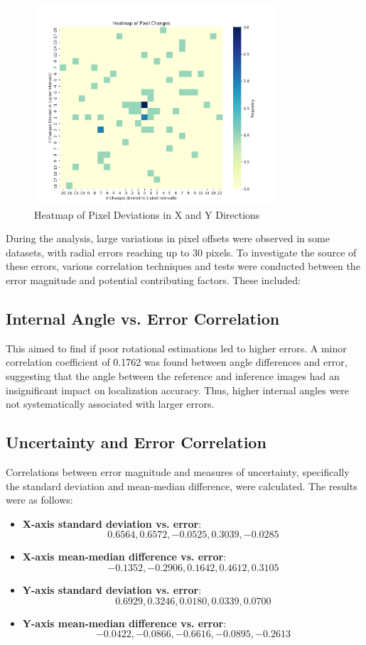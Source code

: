 \begin{figure}[H]
    \centering
    \includegraphics[width=0.8\textwidth]{Chapter 5/RESULTPLOTS/BIASPLOT_XY_HEAT.png}
    \caption{Heatmap of Pixel Deviations in X and Y Directions}
    \label{fig:Heatmap_XY_Dev}
\end{figure}


During the analysis, large variations in pixel offsets were observed in some datasets, with radial errors reaching up to 30 pixels. To investigate the source of these errors, various correlation techniques and tests were conducted between the error magnitude and potential contributing factors. These included:

\subsection{Internal Angle vs. Error Correlation}
This aimed to find if poor rotational estimations led to higher errors. A minor correlation coefficient of 0.1762 was found between angle differences and error, suggesting that the angle between the reference and inference images had an insignificant impact on localization accuracy. Thus, higher internal angles were not systematically associated with larger errors.

\subsection{Uncertainty and Error Correlation}
Correlations between error magnitude and measures of uncertainty, specifically the standard deviation and mean-median difference, were calculated. The results were as follows:

\begin{itemize}
    \item \textbf{X-axis standard deviation vs. error}: \[0.6564, 0.6572, -0.0525, 0.3039, -0.0285\]
    \item \textbf{X-axis mean-median difference vs. error}: \[-0.1352, -0.2906, 0.1642, 0.4612, 0.3105\]
    \item \textbf{Y-axis standard deviation vs. error}: \[0.6929, 0.3246, 0.0180, 0.0339, 0.0700\]
    \item \textbf{Y-axis mean-median difference vs. error}: \[-0.0422, -0.0866, -0.6616, -0.0895, -0.2613\]
\end{itemize}

